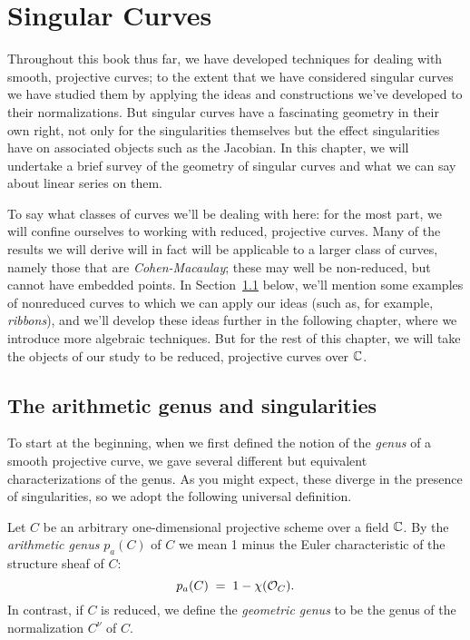 

\chapter{Singular Curves}
\label{SingularCurvesChapter}

Throughout this book thus far, we have developed techniques for dealing with smooth, projective curves; to the extent that we have considered singular curves we have studied them by applying the ideas and constructions we've developed to their normalizations. But singular curves have a fascinating geometry in their own right, not only for the singularities themselves but the effect singularities have on associated objects such as the Jacobian. In this chapter, we will undertake a brief survey of the geometry of singular curves and what we can say about linear series on them.

To say what classes of curves we'll be dealing with here: for the most part, we will confine ourselves to working with reduced, projective curves. Many of the results we will derive will in fact will be applicable to a larger class of curves, namely those that are \emph{Cohen-Macaulay}; these may well be non-reduced, but cannot have embedded points. In Section~\ref{} below, we'll mention some examples of nonreduced curves to which we can apply our ideas (such as, for example, \emph{ribbons}), and we'll develop these ideas further in the following chapter, where we introduce more algebraic techniques. But for the rest of this chapter, we will take the objects of our study to be reduced, projective curves over ${\mathbb C}$.


\section{The arithmetic genus and singularities}

To start at the beginning, when we first defined the notion of the \emph{genus} of a smooth projective curve, we gave several different but equivalent characterizations of the genus. As you might expect, these diverge in the presence of singularities, so we adopt the following universal definition.

\begin{definition}
Let $C$ be an arbitrary one-dimensional projective scheme over a field ${\mathbb C}$. By the \emph{arithmetic genus} $p_a(C)$ of $C$ we mean 1 minus the Euler characteristic of the structure sheaf of $C$:
$$
p_a(C) \; = \; 1 - \chi({\mathcal O}_{C}).
$$
In contrast, if $C$ is reduced, we define the \emph{geometric genus} to be the genus of the normalization $C^\nu$ of $C$.
\end{definition}

